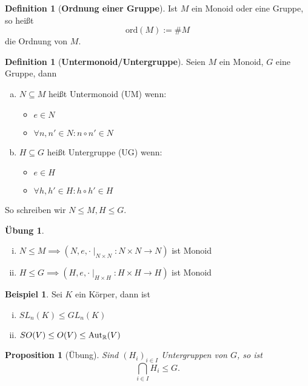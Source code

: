 \documentclass[a4paper]{article}
\theoremstyle{plain}
\newtheorem{prop}[thm]{Proposition}
\theoremstyle{definition}
\newtheorem{defi}[thm]{Definition}
\newtheorem*{bsp*}{Beispiel}
\newtheorem{ubng}[thm]{Übung}
\begin{document}
\begin{defi}[\textbf{Ordnung einer Gruppe}]
  Ist $M$ ein Monoid oder eine Gruppe, so heißt $$\mathrm{ord}(M):=\#M$$
  die Ordnung von $M$.
\end{defi}

\begin{defi}[\textbf{Untermonoid/Untergruppe}]
  Seien $M$ ein Monoid, $G$ eine Gruppe, dann
  \begin{enumerate}[(a)] %
    \item $N \subseteq M$ heißt Untermonoid (UM) wenn:
          \begin{itemize}
            \item $e \in N$
            \item $\forall n, n' \in N : n \circ n' \in N$
          \end{itemize}
    \item $H \subseteq G$ heißt Untergruppe (UG) wenn:
          \begin{itemize}
            \item $e \in H$
            \item $\forall h, h' \in H : h \circ h' \in H$
          \end{itemize}
  \end{enumerate}

So schreiben wir $N \leq M, H \leq G$.
\end{defi}

\begin{ubng}%
  \begin{enumerate}[(i)] %
    \item $N \leq M \implies (N, e, \cdot \mid_{N \times N}:N\times N \to N)$ ist Monoid
    \item $H \leq G \implies (H, e, \cdot \mid_{H \times H}:H\times H \to H)$ ist Monoid
  \end{enumerate}

\end{ubng}
\begin{bsp*}
  Sei $K$ ein Körper, dann ist
  \begin{enumerate}[(i)] %
    \item $SL_{n}(K) \leq GL_{n}(K)$
    \item $SO(V) \leq O(V) \le \mathrm{Aut}_{\Bbb R}(V)$
  \end{enumerate}
\end{bsp*}

\begin{prop}[Übung]
Sind $(H_{i})_{i \in I}$ Untergruppen von $G$, so ist
$$\bigcap_{i \in I} H_{i} \leq G.$$
\end{prop}
\end{document}
